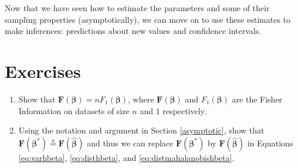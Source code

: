 \documentclass[
  12pt,
]{book}
\begin{document}
Now that we have seen how to estimate the parameters and some of their sampling properties (asymptotically), we can move on to use these estimates to make inferences: predictions about new values and confidence intervals.

\section{Exercises}\label{exercises-1}

\begin{enumerate}
\def\labelenumi{\arabic{enumi}.}
\item
  Show that \(\boldsymbol{F}(\boldsymbol{\beta}) = nF_1(\boldsymbol{\beta})\), where \(\boldsymbol{F}(\boldsymbol{\beta})\) and \(F_1(\boldsymbol{\beta})\) are the Fisher Information on datasets of size \(n\) and \(1\) respectively.
\item
  Using the notation and argument in Section \ref{asymptotic}, show that \(\boldsymbol{F}(\boldsymbol{\beta}^*) \stackrel{a}{=} \boldsymbol{F}(\hat{\boldsymbol{\beta}})\) and thus we can replace \(\boldsymbol{F}(\boldsymbol{\beta}^*)\) by \(\boldsymbol{F}(\hat{\boldsymbol{\beta}})\) in Equations \eqref{eq:varhbeta}, \eqref{eq:disthbeta}, and \eqref{eq:distmahalanobishbeta}.
\end{enumerate}

  
\end{document}

